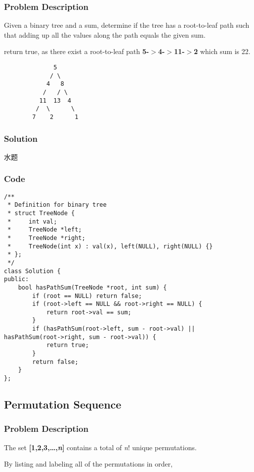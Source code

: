 \documentclass[courier]{article}
\begin{document}
\begin{CJK*}{UTF8}{gkai}
\subsubsection*{Problem Description}
Given a binary tree and a sum, determine if the tree has a root-to-leaf path such that adding up all the values along the path equals the given sum.

return true, as there exist a root-to-leaf path \textbf{5-$>$4-$>$11-$>$2} which sum is 22.

\begin{verbatim}
              5
             / \
            4   8
           /   / \
          11  13  4
         /  \      \
        7    2      1
\end{verbatim}


\subsubsection*{Solution}
水题

\subsubsection*{Code}
\begin{lstlisting}
/**
 * Definition for binary tree
 * struct TreeNode {
 *     int val;
 *     TreeNode *left;
 *     TreeNode *right;
 *     TreeNode(int x) : val(x), left(NULL), right(NULL) {}
 * };
 */
class Solution {
public:
    bool hasPathSum(TreeNode *root, int sum) {
        if (root == NULL) return false;
        if (root->left == NULL && root->right == NULL) {
            return root->val == sum;
        }
        if (hasPathSum(root->left, sum - root->val) || hasPathSum(root->right, sum - root->val)) {
            return true;
        }
        return false;
    }
}; 
\end{lstlisting}


\subsection{ Permutation Sequence }

\subsubsection*{Problem Description}
The set \textbf{[1,2,3,…,\emph{n}]} contains a total of \emph{n}! unique permutations.

By listing and labeling all of the permutations in order,



\end{CJK*}
\end{document}
